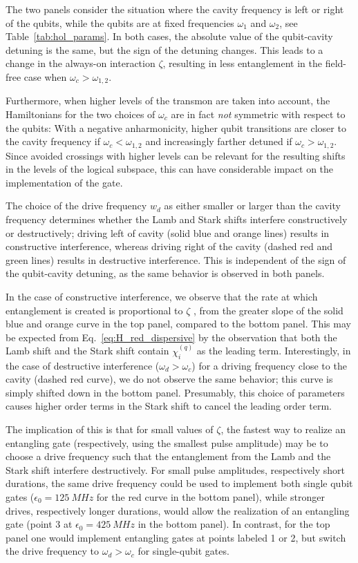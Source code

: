 The two panels consider the situation where the cavity frequency is left or
right of the qubits, while the qubits are at fixed frequencies $\omega_1$ and
$\omega_2$, see Table~\ref{tab:hol_params}. In both cases, the absolute value of
the qubit-cavity detuning is the same, but the sign of the detuning changes.
This leads to a change in the always-on interaction $\zeta$, resulting in less
entanglement in the field-free case when $\omega_c > \omega_{1,2}$.

Furthermore, when higher levels of the transmon are taken into account, the
Hamiltonians for the two choices of $\omega_c$ are in fact \emph{not} symmetric
with respect to the qubits:
With a negative anharmonicity, higher qubit transitions are closer to
the cavity frequency if $\omega_c < \omega_{1,2}$ and increasingly farther
detuned if $\omega_c > \omega_{1,2}$. Since avoided crossings with higher
levels can be relevant for the resulting shifts in the levels of the logical
subspace, this can have considerable impact on the implementation of the gate.

The choice of the drive frequency $w_d$ as either smaller or larger than the
cavity frequency determines whether the Lamb and Stark shifts interfere
constructively or destructively; driving left of cavity (solid blue and orange
lines) results in constructive interference, whereas driving right of
the cavity (dashed red and green lines) results in destructive interference.
This is independent of the sign of the qubit-cavity detuning, as the same
behavior is observed in both panels.

In the case of constructive interference, we observe that the rate at which
entanglement is created is proportional to $\zeta$ , from the greater slope of
the solid blue and orange curve in the top panel, compared to the bottom panel.
This may be expected from Eq.~\eqref{eq:H_red_dispersive} by the observation
that both the Lamb shift and the Stark shift contain $\chi_i^{(q)}$ as the
leading term. Interestingly, in the case of destructive interference
($\omega_d > \omega_c$) for a driving frequency close to the cavity (dashed red
curve), we do not observe the same behavior; this curve is simply shifted down
in the bottom panel. Presumably, this choice of parameters causes
higher order terms in the Stark shift to cancel the leading order term.

The implication of this is that for small values of $\zeta$, the fastest way to
realize an entangling gate (respectively, using the smallest pulse amplitude)
may be to choose a drive frequency such that the entanglement from the Lamb and
the Stark shift interfere destructively. For small pulse amplitudes,
respectively short durations, the same drive frequency could be used to
implement both single qubit gates ($\epsilon_0 = \SI{125}{MHz}$ for the red
curve in the bottom panel), while stronger drives, respectively longer durations,
would allow the realization of an entangling gate (point 3 at $\epsilon_0
= \SI{425}{MHz}$ in the bottom panel). In contrast, for the top panel one would
implement entangling gates at points labeled 1 or 2, but switch the drive
frequency to $\omega_d > \omega_c$ for single-qubit gates.

